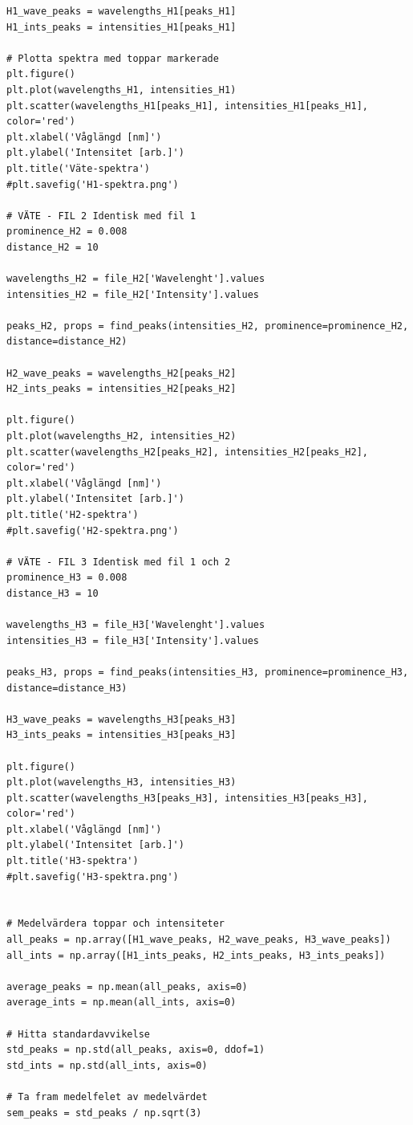 \documentclass[12pt, a4paper]{article}
\begin{document}
\begin{lstlisting}[style=mypython]
H1_wave_peaks = wavelengths_H1[peaks_H1]
H1_ints_peaks = intensities_H1[peaks_H1]

# Plotta spektra med toppar markerade
plt.figure()
plt.plot(wavelengths_H1, intensities_H1)
plt.scatter(wavelengths_H1[peaks_H1], intensities_H1[peaks_H1], color='red')
plt.xlabel('Våglängd [nm]')
plt.ylabel('Intensitet [arb.]')
plt.title('Väte-spektra')
#plt.savefig('H1-spektra.png')

# VÄTE - FIL 2 Identisk med fil 1
prominence_H2 = 0.008
distance_H2 = 10

wavelengths_H2 = file_H2['Wavelenght'].values
intensities_H2 = file_H2['Intensity'].values

peaks_H2, props = find_peaks(intensities_H2, prominence=prominence_H2, distance=distance_H2)

H2_wave_peaks = wavelengths_H2[peaks_H2]
H2_ints_peaks = intensities_H2[peaks_H2]

plt.figure()
plt.plot(wavelengths_H2, intensities_H2)
plt.scatter(wavelengths_H2[peaks_H2], intensities_H2[peaks_H2], color='red')
plt.xlabel('Våglängd [nm]')
plt.ylabel('Intensitet [arb.]')
plt.title('H2-spektra')
#plt.savefig('H2-spektra.png')

# VÄTE - FIL 3 Identisk med fil 1 och 2
prominence_H3 = 0.008
distance_H3 = 10

wavelengths_H3 = file_H3['Wavelenght'].values
intensities_H3 = file_H3['Intensity'].values

peaks_H3, props = find_peaks(intensities_H3, prominence=prominence_H3, distance=distance_H3)

H3_wave_peaks = wavelengths_H3[peaks_H3]
H3_ints_peaks = intensities_H3[peaks_H3]

plt.figure()
plt.plot(wavelengths_H3, intensities_H3)
plt.scatter(wavelengths_H3[peaks_H3], intensities_H3[peaks_H3], color='red')
plt.xlabel('Våglängd [nm]')
plt.ylabel('Intensitet [arb.]')
plt.title('H3-spektra')
#plt.savefig('H3-spektra.png')


# Medelvärdera toppar och intensiteter
all_peaks = np.array([H1_wave_peaks, H2_wave_peaks, H3_wave_peaks])
all_ints = np.array([H1_ints_peaks, H2_ints_peaks, H3_ints_peaks])

average_peaks = np.mean(all_peaks, axis=0)
average_ints = np.mean(all_ints, axis=0)

# Hitta standardavvikelse
std_peaks = np.std(all_peaks, axis=0, ddof=1)
std_ints = np.std(all_ints, axis=0)

# Ta fram medelfelet av medelvärdet
sem_peaks = std_peaks / np.sqrt(3)


\end{lstlisting}
\end{document}
